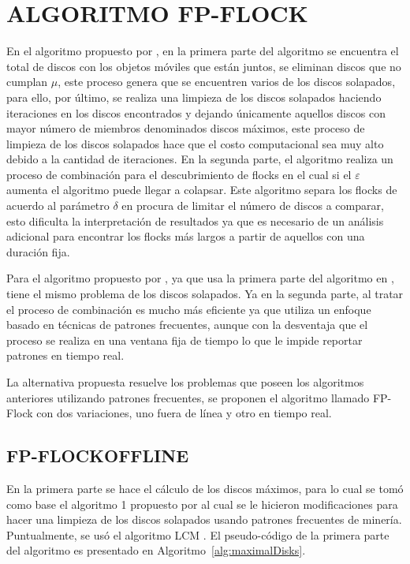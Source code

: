 \chapter{ALGORITMO FP-FLOCK}

En el algoritmo propuesto por \cite{VieiraT13}, en la primera parte del algoritmo se encuentra el total de discos con los 
objetos móviles que están juntos, se eliminan discos que no cumplan $\mu$, este proceso genera que se encuentren varios de
 los discos solapados, para ello, por último, se realiza una limpieza de los discos solapados haciendo iteraciones en los discos
 encontrados y dejando únicamente aquellos discos con mayor número de miembros denominados discos máximos, este proceso de
 limpieza de los discos solapados hace que el costo computacional sea muy alto debido a la cantidad de iteraciones. En la 
segunda parte, el algoritmo realiza un proceso de combinación para el descubrimiento de flocks en el cual si el $\varepsilon$ aumenta
 el algoritmo puede llegar a colapsar. Este algoritmo separa los flocks de acuerdo al parámetro $\delta$ en procura de limitar
 el número de discos a comparar, esto dificulta la interpretación de resultados ya que es necesario de un análisis adicional 
para encontrar los flocks más largos a partir de aquellos con una duración fija.

Para el algoritmo propuesto por \cite{romero2011mining}, ya que usa la primera parte del algoritmo en \cite{VieiraT13}, tiene 
el mismo problema de los discos solapados. Ya en la segunda parte, al tratar el proceso de combinación es mucho más
eficiente ya que utiliza un enfoque basado en técnicas de patrones frecuentes, aunque con la desventaja que el proceso se 
realiza en una ventana fija  de tiempo  lo que le impide reportar patrones en tiempo real. 

La alternativa propuesta resuelve los problemas que poseen los algoritmos anteriores utilizando patrones frecuentes, se proponen 
el algoritmo llamado FP-Flock con dos variaciones, uno fuera de línea y otro en tiempo real.


\section{FP-FLOCKOFFLINE}

En la primera parte se hace el cálculo de los discos máximos, para lo cual se tomó como base el algoritmo 1 propuesto
 por \cite{VieiraT13} al cual se le hicieron modificaciones para hacer una limpieza de los discos solapados usando 
patrones frecuentes de minería. Puntualmente, se usó el algoritmo LCM \cite{uno2005lcm}. El pseudo-código de la primera
 parte del algoritmo es presentado en Algoritmo~\ref{alg:maximalDisks}. 

